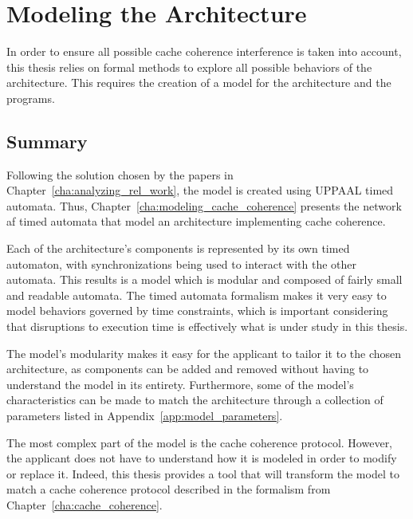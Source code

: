 \section{Modeling the Architecture}
In order to ensure all possible cache coherence interference is taken into
account, this thesis relies on formal methods to explore all possible behaviors
of the architecture. This requires the creation of a model for the architecture
and the programs.

\subsection{Summary}
Following the solution chosen by the papers in
Chapter~\ref{cha:analyzing_rel_work}, the model is created using UPPAAL timed
automata. Thus, Chapter~\ref{cha:modeling_cache_coherence} presents the network
af timed automata that model an architecture implementing cache coherence.

Each of the architecture's components is represented by its own timed
automaton, with synchronizations being used to interact with the other
automata. This results is a model which is modular and composed of fairly small
and readable automata. The timed automata formalism makes it very easy to model
behaviors governed by time constraints, which is important considering that
disruptions to execution time is effectively what is under study in this
thesis.

The model's modularity makes it easy for the applicant to tailor it to the
chosen architecture, as components can be added and removed without having to
understand the model in its entirety. Furthermore, some of the model's
characteristics can be made to match the architecture through a collection of
parameters listed in Appendix~\ref{app:model_parameters}.

The most complex part of the model is the cache coherence protocol. However, the
applicant does not have to understand how it is modeled in order to modify or
replace it. Indeed, this thesis provides a tool that will transform the model
to match a cache coherence protocol described in the formalism from
Chapter~\ref{cha:cache_coherence}.

